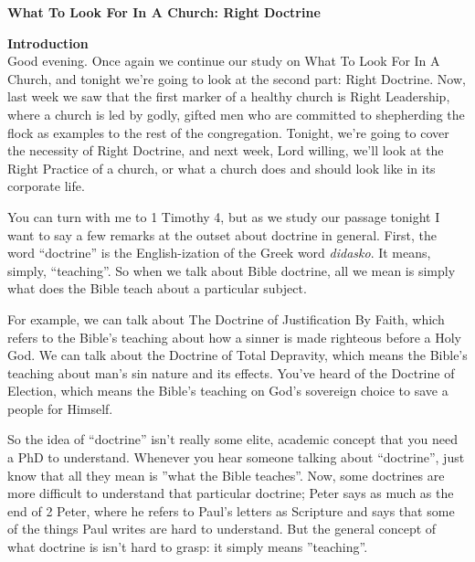 \documentclass[letterpaper, 12pt]{article}
\begin{document}
    \thispagestyle{empty}

    \begin{center}

        \textbf{\large{What To Look For In A Church: Right Doctrine}}

    \end{center}

    \noindent \textbf{Introduction} \\

    Good evening. Once again we continue our study on What To Look For
    In A Church, and tonight we're going to look at the second part:
    Right Doctrine. Now, last week we saw that the first marker of a
    healthy church is Right Leadership, where a church is led by godly,
    gifted men who are committed to shepherding the flock as examples to
    the rest of the congregation. Tonight, we're going to cover the
    necessity of Right Doctrine, and next week, Lord willing, we'll look
    at the Right Practice of a church, or what a church does and should
    look like in its corporate life.

    You can turn with me to 1 Timothy 4, but as we study our passage
    tonight I want to say a few remarks at the outset about doctrine in
    general. First, the word ``doctrine'' is the English-ization of the
    Greek word \emph{didasko}. It means, simply, ``teaching''. So when
    we talk about Bible doctrine, all we mean is simply what does the
    Bible teach about a particular subject.

    For example, we can talk about The Doctrine of Justification By
    Faith, which refers to the Bible's teaching about how a sinner is
    made righteous before a Holy God. We can talk about the Doctrine of
    Total Depravity, which means the Bible's teaching about man's sin
    nature and its effects. You've heard of the Doctrine of Election,
    which means the Bible's teaching on God's sovereign choice to save a
    people for Himself.

    So the idea of ``doctrine'' isn't really some elite, academic
    concept that you need a PhD to understand. Whenever you hear someone
    talking about ``doctrine'', just know that all they mean is ''what
    the Bible teaches''. Now, some doctrines are more difficult to
    understand that particular doctrine; Peter says as much as the end
    of 2 Peter, where he refers to Paul's letters as Scripture and says
    that some of the things Paul writes are hard to understand. But the
    general concept of what doctrine is isn't hard to grasp: it simply
    means ''teaching''.
\end{document}
